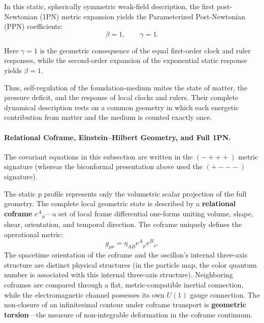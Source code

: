 \documentclass[11pt,a4paper]{article}
\begin{document}
In this static, spherically symmetric weak-field description, the first post-Newtonian (1PN) metric expansion yields the Parameterized Post-Newtonian (PPN) coefficients:
\begin{equation}
\beta = 1, \qquad \gamma = 1.
\end{equation}

Here $\gamma=1$ is the geometric consequence of the equal first-order clock and ruler responses, while the second-order expansion of the exponential static response yields $\beta=1$.

Thus, self-regulation of the foundation-medium unites the state of matter, the pressure deficit, and the response of local clocks and rulers. Their complete dynamical description rests on a common geometry in which each energetic contribution from matter and the medium is counted exactly once.

\paragraph{Relational Coframe, Einstein--Hilbert Geometry, and Full 1PN.}

The covariant equations in this subsection are written in the $(-+++)$ metric signature (whereas the biconformal presentation above used the $(+---)$ signature).

The static $p$ profile represents only the volumetric scalar projection of the full geometry. The complete local geometric state is described by a \textbf{relational coframe} $e^A{}_\mu$---a set of local frame differential one-forms uniting volume, shape, shear, orientation, and temporal direction. The coframe uniquely defines the operational metric:
\begin{equation}
g_{\mu\nu}=\eta_{AB}e^A{}_\mu e^B{}_\nu.
\end{equation}
The spacetime orientation of the coframe and the oscillon's internal three-axis structure are distinct physical structures (in the particle map, the color quantum number is associated with this internal three-axis structure). Neighboring coframes are compared through a flat, metric-compatible inertial connection, while the electromagnetic channel possesses its own $U(1)$ gauge connection. The non-closure of an infinitesimal contour under coframe transport is \textbf{geometric torsion}---the measure of non-integrable deformation in the coframe continuum.
\end{document}

